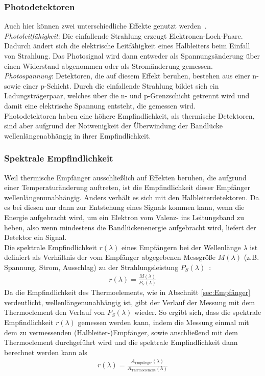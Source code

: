 \documentclass[a4paper,twoside,final]{article}
\begin{document}
\subsubsection{Photodetektoren}
Auch hier können zwei unterschiedliche Effekte genutzt werden~\cite{Gunzler}.\\
\emph{Photoleitfähigkeit}: Die einfallende Strahlung erzeugt Elektronen-Loch-Paare. Dadurch ändert sich die elektrische Leitfähigkeit eines Halbleiters beim Einfall von Strahlung. Das Photosignal wird dann entweder als Spannungsänderung über einen Widerstand abgenommen oder als Stromänderung gemessen. \\
\emph{Photospannung}: Detektoren, die auf diesem Effekt beruhen, bestehen aus einer n- sowie einer p-Schicht. Durch die einfallende Strahlung bildet sich ein Ladungsträgerpaar, welches über die n- und p-Grenzschicht getrennt wird und damit eine elektrische Spannung entsteht, die gemessen wird. \\
Photodetektoren haben eine höhere Empfindlichkeit, als thermische Detektoren, sind aber aufgrund der Notwenigkeit der Überwindung der Bandlücke wellenlängenabhängig in ihrer Empfindlichkeit.

\subsubsection{Spektrale Empfindlichkeit}
Weil thermische Empfänger ausschließlich auf Effekten beruhen, die aufgrund einer Temperaturänderung auftreten, ist die Empfindlichkeit dieser Empfänger wellenlängenunabhängig. Anders verhält es sich mit den Halbleiterdetektoren. Da es bei diesen nur dann zur Entstehung eines Signals kommen kann, wenn die Energie aufgebracht wird, um ein Elektron vom Valenz- ins Leitungsband zu heben, also wenn mindestens die Bandlückenenergie aufgebracht wird, liefert der Detektor ein Signal. \\
Die spektrale Empfindlichkeit $r(\lambda)$ eines Empfängern bei der Wellenlänge $\lambda$ ist definiert als Verhältnis der vom Empfänger abgegebenen Messgröße $M(\lambda)$ (z.B. Spannung, Strom, Ausschlag) zu der Strahlungsleistung $P_S(\lambda)$~\cite{Mutschke}:
\begin{align}
  r(\lambda) = \frac{M(\lambda)}{P_S(\lambda)}
\end{align}
Da die Empfindlichkeit des Thermoelements, wie in Abschnitt \ref{sec:Empfänger} verdeutlicht, wellenlängenunabhängig ist, gibt der Verlauf der Messung mit dem Thermoelement den Verlauf von $P_S(\lambda)$ wieder. So ergibt sich, dass die spektrale Empfindlichkeit $r(\lambda)$ gemessen werden kann, indem die Messung einmal mit dem zu vermessenden (Halbleiter-)Empfänger, sowie anschließend mit dem Thermoelement durchgeführt wird und die spektrale Empfindlichkeit dann berechnet werden kann als
\begin{align}
  r(\lambda) = \frac{A_\text{Empfänger}(\lambda)}{A_\text{Thermoelement}(\lambda)}
\end{align}
\end{document}
